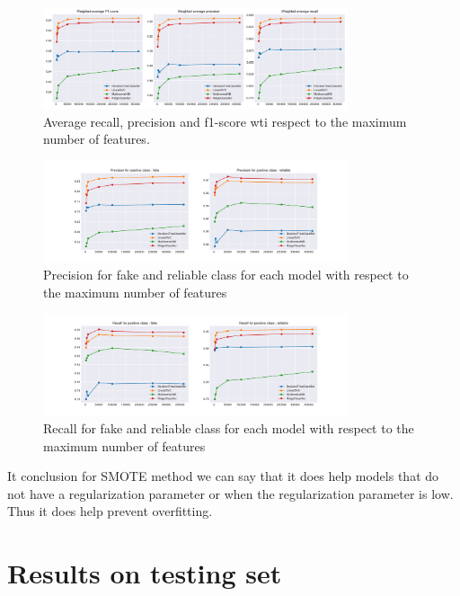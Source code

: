 \begin{figure}
 \centering
 \includegraphics[width=0.8\textwidth]{images/chapitre3/ML_SMOTE_fake_average}
 \caption{Average recall, precision and f1-score wti respect to the maximum number of features.}
 \label{fig:chap3:smote_max_feat1}
\end{figure}
\begin{figure}
 \centering
 \includegraphics[width=0.8\textwidth]{images/chapitre3/ML_SMOTE_fake_precision}
 \caption{Precision for fake and reliable class for each model with respect to the maximum number of features}
 \label{fig:chap3:smote_max_feat2}
\end{figure}
\begin{figure}
 \centering
 \includegraphics[width=0.8\textwidth]{images/chapitre3/ML_SMOTE_fake_recall}
 \caption{Recall for fake and reliable class for each model with respect to the maximum number of features}
 \label{fig:chap3:smote_max_feat3}
\end{figure}
It conclusion for SMOTE method we can say that it does help models that do not have a regularization parameter or when the regularization parameter is low. Thus it does help prevent overfitting.
\section{Results on testing set}
